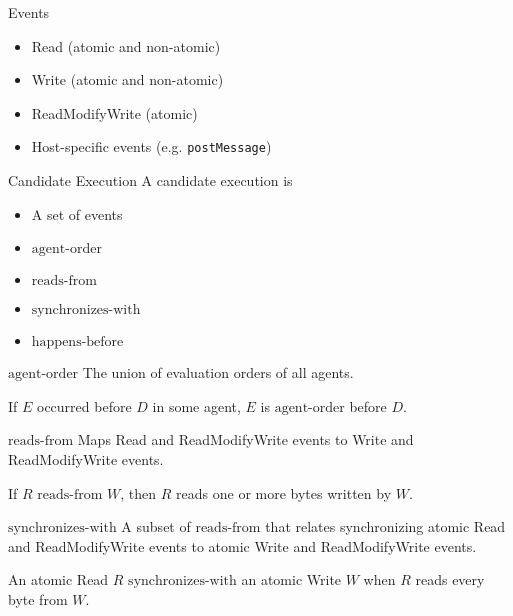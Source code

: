 \documentclass{beamer}
\begin{document}
\begin{frame}{Events}
  \begin{itemize}
  \item Read (atomic and non-atomic)
  \item Write (atomic and non-atomic)
  \item ReadModifyWrite (atomic)
  \item Host-specific events (e.g. \texttt{postMessage})
  \end{itemize}

\end{frame}

\begin{frame}{Candidate Execution}
  A candidate execution is

  \begin{itemize}
  \item A set of events
  \item $\textrm{agent-order}$
  \item $\textrm{reads-from}$
  \item $\textrm{synchronizes-with}$
  \item $\textrm{happens-before}$
  \end{itemize}
\end{frame}

\begin{frame}{$\textrm{agent-order}$}
  The union of evaluation orders of all agents.

  \begin{center}
    If $E$ occurred before $D$ in some agent, $E$ is $\textrm{agent-order}$ before $D$.
  \end{center}
\end{frame}

\begin{frame}{$\textrm{reads-from}$}
  Maps Read and ReadModifyWrite events to Write and ReadModifyWrite events.

  \begin{center}
    If $R$ $\textrm{reads-from}$ $W$, then $R$ reads one or more bytes written by $W$.
  \end{center}
\end{frame}

\begin{frame}{$\textrm{synchronizes-with}$}
  A subset of $\textrm{reads-from}$ that relates synchronizing atomic Read and ReadModifyWrite events to atomic Write and ReadModifyWrite events.

  \begin{center}
    An atomic Read $R$ $\textrm{synchronizes-with}$ an atomic Write $W$ when $R$ reads every byte from $W$.
  \end{center}

\end{frame}
\end{document}
